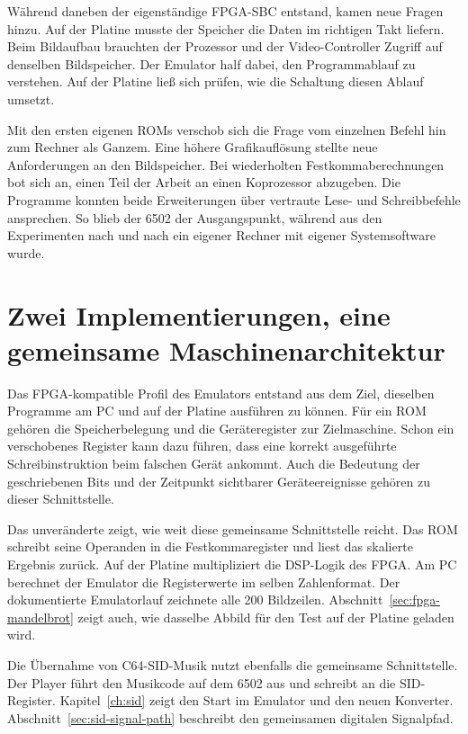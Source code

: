 \documentclass[fontsize=10.2bp,DIV=calc,oneside,open=any,headings=normal,numbers=noenddot]{scrbook}
\begin{document}
Während daneben der eigenständige FPGA-SBC entstand, kamen neue
Fragen hinzu. Auf der Platine musste der Speicher die Daten im
richtigen Takt liefern. Beim Bildaufbau brauchten der Prozessor und
der Video-Controller Zugriff auf denselben Bildspeicher. Der Emulator
half dabei, den Programmablauf zu verstehen. Auf der Platine ließ
sich prüfen, wie die Schaltung diesen Ablauf umsetzt.

Mit den ersten eigenen ROMs verschob sich die Frage vom einzelnen
Befehl hin zum Rechner als Ganzem. Eine höhere Grafikauflösung stellte
neue Anforderungen an den Bildspeicher. Bei wiederholten
Festkommaberechnungen bot sich an, einen Teil der Arbeit an einen
Koprozessor abzugeben. Die Programme konnten beide Erweiterungen über
vertraute Lese- und Schreibbefehle ansprechen. So blieb der 6502 der
Ausgangspunkt, während aus den Experimenten nach und nach ein eigener
Rechner mit eigener Systemsoftware wurde.

\section{Zwei Implementierungen, eine gemeinsame Maschinenarchitektur}
\label{sec:common-machine}

Das FPGA-kompatible Profil des Emulators entstand aus dem Ziel, dieselben
Programme am PC und auf der Platine ausführen zu können. Für ein ROM
gehören die Speicherbelegung und die Geräteregister zur Zielmaschine.
Schon ein verschobenes Register kann dazu führen, dass eine korrekt
ausgeführte Schreibinstruktion beim falschen Gerät ankommt. Auch die
Bedeutung der geschriebenen Bits und der Zeitpunkt sichtbarer
Geräteereignisse gehören zu dieser Schnittstelle.

Das unveränderte  zeigt, wie weit diese
gemeinsame Schnittstelle reicht. Das ROM schreibt seine Operanden in die
Festkommaregister und liest das skalierte Ergebnis zurück. Auf der Platine
multipliziert die DSP-Logik des FPGA. Am PC berechnet der Emulator die
Registerwerte im selben Zahlenformat. Der dokumentierte Emulatorlauf
zeichnete alle 200 Bildzeilen. Abschnitt~\ref{sec:fpga-mandelbrot} zeigt
auch, wie dasselbe Abbild für den Test auf der Platine geladen wird.

Die Übernahme von C64-SID-Musik nutzt ebenfalls die gemeinsame
Schnittstelle. Der Player führt den Musikcode auf dem 6502 aus und
schreibt an die SID-Register. Kapitel~\ref{ch:sid} zeigt den Start
im Emulator und den neuen Konverter. Abschnitt~\ref{sec:sid-signal-path}
beschreibt den gemeinsamen digitalen Signalpfad.
\end{document}
